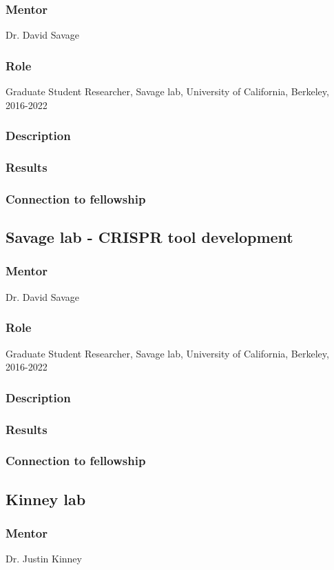 \documentclass[11pt]{article}
\begin{document}
\subsubsection{Mentor}
Dr. David Savage
%
\subsubsection{Role}
Graduate Student Researcher, Savage lab, University of California, Berkeley, 2016-2022
%
\subsubsection{Description}
%
\subsubsection{Results}
%
\subsubsection{Connection to fellowship}
%
\subsection{Savage lab - CRISPR tool development}
%
\subsubsection{Mentor}
Dr. David Savage
%
\subsubsection{Role}
Graduate Student Researcher, Savage lab, University of California, Berkeley, 2016-2022
%
\subsubsection{Description}
%
\subsubsection{Results}
%
\subsubsection{Connection to fellowship}
%
\subsection{Kinney lab}
%
\subsubsection{Mentor}
Dr. Justin Kinney
%
\end{document}

